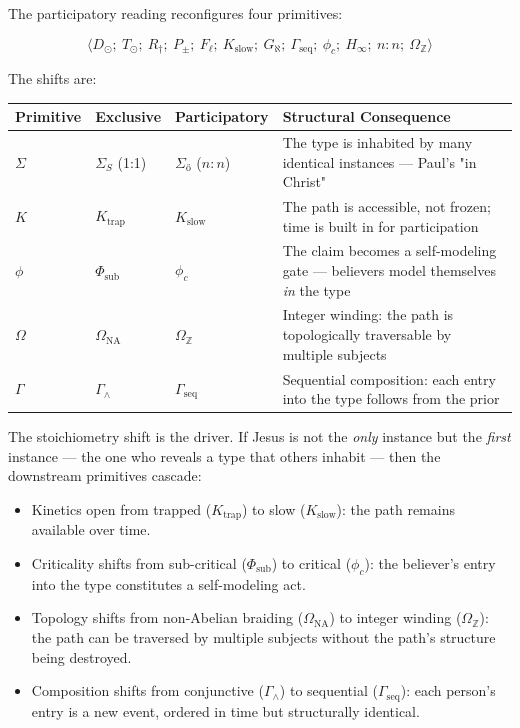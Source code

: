 \documentclass[12pt,a4paper]{article}
\begin{document}
The participatory reading reconfigures four primitives:

\[\langle D_{\odot};\ T_{\odot};\ R_{\dagger};\ P_{\pm};\ F_{\ell};\ K_\text{slow};\ G_{\aleph};\ \Gamma_\text{seq};\ \phi_c;\ H_{\infty};\ n{:}n;\ \Omega_\mathbb{Z} \rangle\]

The shifts are:

\begin{table}[htbp]
\centering
\small
{}
\begin{tabularx}{\textwidth}{>{\centering\arraybackslash}X >{\centering\arraybackslash}X >{\centering\arraybackslash}X >{\centering\arraybackslash}X}
\toprule
\rowcolor{gray!25}\textbf{Primitive} & \textbf{Exclusive} & \textbf{Participatory} & \textbf{Structural Consequence} \\
\midrule
\rowcolors{1}{white}{gray!10}
$\Sigma$ & $\Sigma_S$ (1:1) & $\Sigma_ő$ ($n{:}n$) & The type is inhabited by many identical instances --- Paul's "in Christ" \\
$K$ & $K_\text{trap}$ & $K_\text{slow}$ & The path is accessible, not frozen; time is built in for participation \\
$\phi$ & $\Phi_\text{sub}$ & $\phi_c$ & The claim becomes a self-modeling gate --- believers model themselves \emph{in} the type \\
$\Omega$ & $\Omega_\text{NA}$ & $\Omega_\mathbb{Z}$ & Integer winding: the path is topologically traversable by multiple subjects \\
$\Gamma$ & $\Gamma_{\wedge}$ & $\Gamma_\text{seq}$ & Sequential composition: each entry into the type follows from the prior \\
\bottomrule
\end{tabularx}
\end{table}

The stoichiometry shift is the driver. If Jesus is not the \emph{only} instance but the \emph{first} instance --- the one who reveals a type that others inhabit --- then the downstream primitives cascade:

\begin{itemize}
    \item Kinetics open from trapped ($K_\text{trap}$) to slow ($K_\text{slow}$): the path remains available over time.
    \item Criticality shifts from sub-critical ($\Phi_\text{sub}$) to critical ($\phi_c$): the believer's entry into the type constitutes a self-modeling act.
    \item Topology shifts from non-Abelian braiding ($\Omega_\text{NA}$) to integer winding ($\Omega_\mathbb{Z}$): the path can be traversed by multiple subjects without the path's structure being destroyed.
    \item Composition shifts from conjunctive ($\Gamma_{\wedge}$) to sequential ($\Gamma_\text{seq}$): each person's entry is a new event, ordered in time but structurally identical.
\end{itemize}
\end{document}
